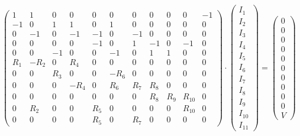 \documentclass[12pt,thmsa]{article}
\begin{document}
$\left( 
\begin{array}{lllllllllll}
1 & 1 & 0 & 0 & 0 & 0 & 0 & 0 & 0 & 0 & -1 \\ 
-1 & 0 & 1 & 1 & 0 & 1 & 0 & 0 & 0 & 0 & 0 \\ 
0 & -1 & 0 & -1 & -1 & 0 & -1 & 0 & 0 & 0 & 0 \\ 
0 & 0 & 0 & 0 & -1 & 0 & 1 & -1 & 0 & -1 & 0 \\ 
0 & 0 & -1 & 0 & 0 & -1 & 0 & 1 & 1 & 0 & 0 \\ 
R_{1} & -R_{2} & 0 & R_{4} & 0 & 0 & 0 & 0 & 0 & 0 & 0 \\ 
0 & 0 & R_{3} & 0 & 0 & -R_{6} & 0 & 0 & 0 & 0 & 0 \\ 
0 & 0 & 0 & -R_{4} & 0 & R_{6} & R_{7} & R_{8} & 0 & 0 & 0 \\ 
0 & 0 & 0 & 0 & 0 & 0 & 0 & R_{8} & R_{9} & R_{10} & 0 \\ 
0 & R_{2} & 0 & 0 & R_{5} & 0 & 0 & 0 & 0 & R_{10} & 0 \\ 
0 & 0 & 0 & 0 & R_{5} & 0 & R_{7} & 0 & 0 & 0 & 0
\end{array}
\right) \cdot \left( 
\begin{array}{l}
I_{1} \\ 
I_{2} \\ 
I_{3} \\ 
I_{4} \\ 
I_{5} \\ 
I_{6} \\ 
I_{7} \\ 
I_{8} \\ 
I_{9} \\ 
I_{10} \\ 
I_{11}
\end{array}
\right) =\left( 
\begin{array}{l}
0 \\ 
0 \\ 
0 \\ 
0 \\ 
0 \\ 
0 \\ 
0 \\ 
0 \\ 
0 \\ 
0 \\ 
V
\end{array}
\right) $
\end{document}
